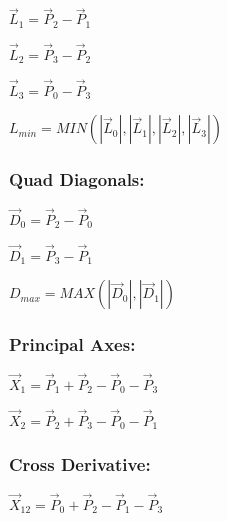 \documentclass[12pt]{article}
\begin{document}
\begin{center}
$\vec L_1 = \vec P_2 - \vec P_1 $
\end{center}

\begin{center}
$\vec L_2 = \vec P_3 - \vec P_2 $
\end{center}

\begin{center}
$\vec L_3 = \vec P_0 - \vec P_3 $
\end{center}

\begin{center}
$L_{min} = MIN( |\vec L_0|,  |\vec L_1|, |\vec L_2|, |\vec L_3| ) $
\end{center}


\subsubsection*{Quad Diagonals:}

\begin{center}
$\vec D_0 = \vec P_2 - \vec P_0 $
\end{center}

\begin{center}
$\vec D_1 = \vec P_3 - \vec P_1 $
\end{center}

\begin{center}
$D_{max} = MAX( |\vec D_0|,  |\vec D_1| ) $
\end{center}

\subsubsection*{Principal Axes:}

\begin{center}
$\vec X_1 = \vec P_1 + \vec P_2 - \vec P_0 - \vec P_3 $
\end{center}

\begin{center}
$\vec X_2 = \vec P_2 + \vec P_3 - \vec P_0 - \vec P_1 $
\end{center}

\subsubsection*{Cross Derivative:}

\begin{center}
$\vec X_{12} = \vec P_0 + \vec P_2 - \vec P_1 - \vec P_3 $
\end{center}
\end{document}
